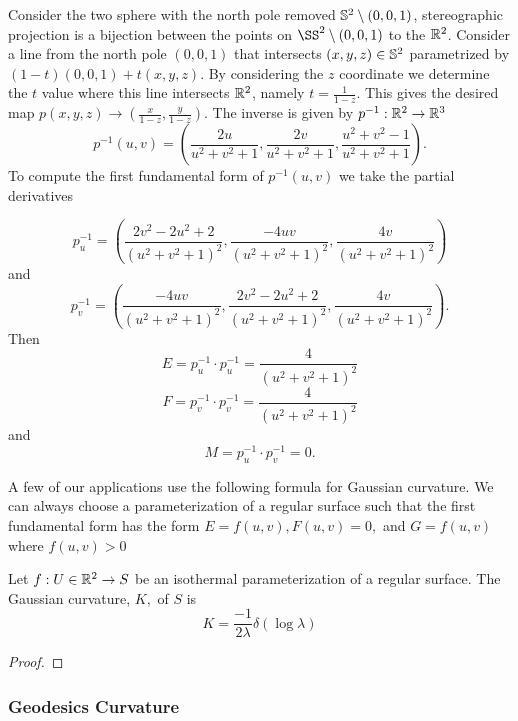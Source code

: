 \begin{example}\label{ex:stereo}
Consider the two sphere with the north pole removed $\mathbb{S}^2 \setminus (0,0,1)$,
stereographic projection is a bijection between the points on $\SS^2 \setminus (0,0,1)$ to the $\mathbb{R}^2$.
Consider a line from the north pole $(0,0,1)$ that intersects $(x,y,z)\in \mathbb{S}^2$ parametrized by 
$(1-t)(0,0,1)+t(x,y,z)$. By considering the $z$ coordinate we determine the $t$ value where this line
intersects $\mathbb{R}^2$, namely $t=\frac{1}{1-z}.$
This gives the desired map $p(x,y,z)\to \left(\frac{x}{1-z},\frac{y}{1-z}\right).$
The inverse is given by $p^{-1}:\mathbb{R}^2\to \mathbb{R}^3$
$$p^{-1}(u,v)=\left(\frac{2u}{u^2+v^2+1},\frac{2v}{u^2+v^2+1},\frac{u^2+v^2-1}{u^2+v^2+1}\right).$$
To compute the first fundamental form of $p^{-1}(u,v)$ we take the partial derivatives

$$p^{-1}_u=\left(\frac{2v^2-2u^2+2}{(u^2+v^2+1)^2},\frac{-4uv}{(u^2+v^2+1)^2},\frac{4v}{(u^2+v^2+1)^2}\right)$$
and 
$$p^{-1}_v=\left(\frac{-4uv}{(u^2+v^2+1)^2},\frac{2v^2-2u^2+2}{(u^2+v^2+1)^2},\frac{4v}{(u^2+v^2+1)^2}\right).$$
Then $$E=p^{-1}_u\cdot p^{-1}_u=\frac{4}{(u^2+v^2+1)^2}$$
$$F=p^{-1}_v\cdot p^{-1}_v=\frac{4}{(u^2+v^2+1)^2}$$
and
$$M=p^{-1}_u\cdot p^{-1}_v=0.$$
\end{example}


A few of our applications use the following
formula for Gaussian curvature.
We can always choose a parameterization of a regular surface 
such that the first fundamental form has the form
$E=f(u,v), F(u,v)=0,$ and $G=f(u,v)$ where $f(u,v)>0$


\begin{theorem}\label{thm:log-curve}
	Let $f:U\in\mathbb{R}^2\to S$ be an isothermal parameterization of a regular surface.
	The Gaussian curvature, $K,$ of $S$ is 
		\begin{equation}\label{eqn:log-curve}
			K=\frac{-1}{2\lambda}\delta(\log \lambda)
		\end{equation}
\end{theorem}
\begin{proof}
\end{proof}

\subsubsection{Geodesics Curvature}

